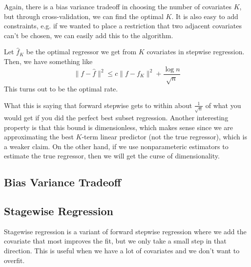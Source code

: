   Again, there is a bias variance tradeoff in choosing the number of covariates $K$, but through cross-validation, we can find the optimal $K$. It is also easy to add constraints, e.g. if we wanted to place a restriction that two adjacent covariates can't be chosen, we can easily add this to the algorithm. 

  \begin{theorem}
    Let $\hat{f}_K$ be the optimal regressor we get from $K$ covariates in stepwise regression. Then, we have something like
    \begin{equation}
      \|f - \hat{f}\|^2 \leq c \|f - f_K\|^2 + \frac{\log{n}}{\sqrt{n}}
    \end{equation}
    This turns out to be the optimal rate. 
  \end{theorem}

  What this is saying that forward stepwise gets to within about $\frac{1}{\sqrt{n}}$ of what you would get if you did the perfect best subset regression. Another interesting property is that this bound is dimensionless, which makes sense since we are approximating the best $K$-term linear predictor (not the true regressor), which is a weaker claim. On the other hand, if we use nonparameteric estimators to estimate the true regressor, then we will get the curse of dimensionality. 

\subsection{Bias Variance Tradeoff}

\subsection{Stagewise Regression} 

  Stagewise regression is a variant of forward stepwise regression where we add the covariate that most improves the fit, but we only take a small step in that direction. This is useful when we have a lot of covariates and we don't want to overfit. 

